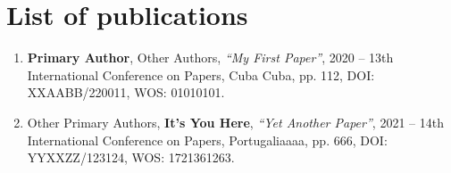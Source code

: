 
\providecommand\publicationslistchaptertitle{List of publications}

\section{\publicationslistchaptertitle}
\label{publications:chapter}
{

\begin{enumerate}

\item \textbf{Primary Author}, Other Authors, \textit{``My First Paper''},
2020 -- 13th International Conference on Papers, Cuba Cuba, pp. 112,
DOI: XXAABB/220011, WOS: 01010101.

\item Other Primary Authors, \textbf{It's You Here}, \textit{``Yet Another Paper''},
2021 -- 14th International Conference on Papers, Portugaliaaaa, pp. 666,
DOI: YYXXZZ/123124, WOS: 1721361263.

\end{enumerate}
}

